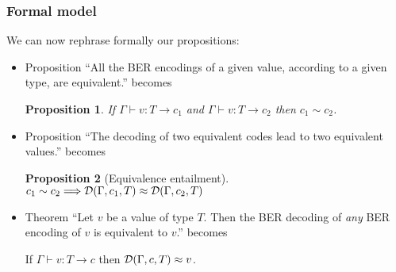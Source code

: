 \documentclass[compress,dvips,xcolor={dvipsnames},t]{beamer}
\newtheorem{proposition}{Proposition}
\newcommand{\coding}[4]{#1 \vdash #2 : #3 \rightarrow #4}
\newcommand{\decoding}[3]{{\cal D}(#1,#2,#3)}
\begin{document}
\begin{frame}
\frametitle{Formal model}

We can now rephrase formally our propositions:
\begin{itemize}

  \item Proposition ``All the BER encodings of a given value,
  according to a given type, are equivalent.'' becomes

  \begin{proposition}
    If $\coding{\Gamma}{v}{T}{c_1}$ and $\coding{\Gamma}{v}{T}{c_2}$
    then $c_1 \sim c_2$.
  \end{proposition}

  \item Proposition ``The decoding of two equivalent codes lead to two
  equivalent values.'' becomes

  \begin{proposition}[Equivalence entailment]
    $c_1 \sim c_2 \Longrightarrow \decoding{\Gamma}{c_1}{T} \approx
    \decoding{\Gamma}{c_2}{T}$
  \end{proposition}

  \item Theorem ``Let $v$ be a value of type $T$. Then the BER
    decoding of \emph{any} BER encoding of $v$ is equivalent to $v$.''
    becomes

  \begin{theorem}[Soundness]
    If $\coding{\Gamma}{v}{T}{c}$ then $\decoding{\Gamma}{c}{T}
    \approx v$.
  \end{theorem}

\end{itemize}

\end{frame}
\end{document}
